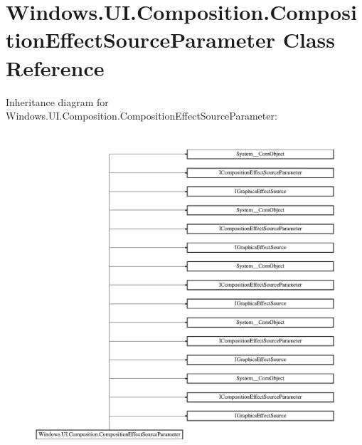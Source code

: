 \hypertarget{class_windows_1_1_u_i_1_1_composition_1_1_composition_effect_source_parameter}{}\section{Windows.\+U\+I.\+Composition.\+Composition\+Effect\+Source\+Parameter Class Reference}
\label{class_windows_1_1_u_i_1_1_composition_1_1_composition_effect_source_parameter}
Inheritance diagram for Windows.\+U\+I.\+Composition.\+Composition\+Effect\+Source\+Parameter\+:\begin{figure}[H]
\begin{center}
\leavevmode
\includegraphics[height=12.000000cm]{class_windows_1_1_u_i_1_1_composition_1_1_composition_effect_source_parameter}
\end{center}
\end{figure}
